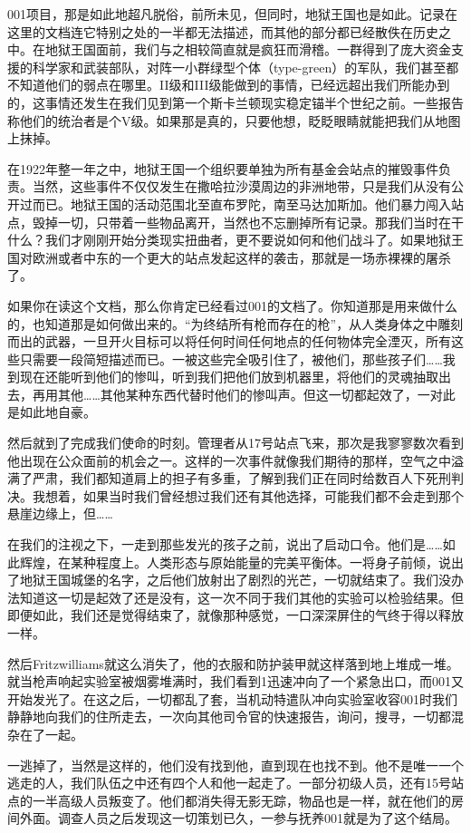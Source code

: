 001项目，那是如此地超凡脱俗，前所未见，但同时，地狱王国也是如此。记录在这里的文档连它特别之处的一半都无法描述，而其他的部分都已经散佚在历史之中。在地狱王国面前，我们与之相较简直就是疯狂而滑稽。一群得到了庞大资金支援的科学家和武装部队，对阵一小群绿型个体（type-green）的军队，我们甚至都不知道他们的弱点在哪里。II级和III级能做到的事情，已经远超出我们所能办到的，这事情还发生在我们见到第一个斯卡兰顿现实稳定锚半个世纪之前。一些报告称他们的统治者是个V级。如果那是真的，只要他想，眨眨眼睛就能把我们从地图上抹掉。

在1922年整一年之中，地狱王国一个组织要单独为所有基金会站点的摧毁事件负责。当然，这些事件不仅仅发生在撒哈拉沙漠周边的非洲地带，只是我们从没有公开过而已。地狱王国的活动范围北至直布罗陀，南至马达加斯加。他们暴力闯入站点，毁掉一切，只带着一些物品离开，当然也不忘删掉所有记录。那我们当时在干什么？我们才刚刚开始分类现实扭曲者，更不要说如何和他们战斗了。如果地狱王国对欧洲或者中东的一个更大的站点发起这样的袭击，那就是一场赤裸裸的屠杀了。

如果你在读这个文档，那么你肯定已经看过001的文档了。你知道那是用来做什么的，也知道那是如何做出来的。“为终结所有枪而存在的枪”，从人类身体之中雕刻而出的武器，一旦开火目标可以将任何时间任何地点的任何物体完全湮灭，所有这些只需要一段简短描述而已。一被这些完全吸引住了，被他们，那些孩子们……我到现在还能听到他们的惨叫，听到我们把他们放到机器里，将他们的灵魂抽取出去，再用其他……其他某种东西代替时他们的惨叫声。但这一切都起效了，一对此是如此地自豪。

然后就到了完成我们使命的时刻。管理者从17号站点飞来，那次是我寥寥数次看到他出现在公众面前的机会之一。这样的一次事件就像我们期待的那样，空气之中溢满了严肃，我们都知道肩上的担子有多重，了解到我们正在同时给数百人下死刑判决。我想着，如果当时我们曾经想过我们还有其他选择，可能我们都不会走到那个悬崖边缘上，但……

在我们的注视之下，一走到那些发光的孩子之前，说出了启动口令。他们是……如此辉煌，在某种程度上。人类形态与原始能量的完美平衡体。一将身子前倾，说出了地狱王国城堡的名字，之后他们放射出了剧烈的光芒，一切就结束了。我们没办法知道这一切是起效了还是没有，这一次不同于我们其他的实验可以检验结果。但即便如此，我们还是觉得结束了，就像那种感觉，一口深深屏住的气终于得以释放一样。

然后Fritzwilliams就这么消失了，他的衣服和防护装甲就这样落到地上堆成一堆。就当枪声响起实验室被烟雾堆满时，我们看到1迅速冲向了一个紧急出口，而001又开始发光了。在这之后，一切都乱了套，当机动特遣队冲向实验室收容001时我们静静地向我们的住所走去，一次向其他司令官的快速报告，询问，搜寻，一切都混杂在了一起。

一逃掉了，当然是这样的，他们没有找到他，直到现在也找不到。他不是唯一一个逃走的人，我们队伍之中还有四个人和他一起走了。一部分初级人员，还有15号站点的一半高级人员叛变了。他们都消失得无影无踪，物品也是一样，就在他们的房间外面。调查人员之后发现这一切策划已久，一参与抚养001就是为了这个结局。

